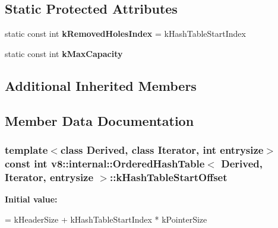 \subsection*{Static Protected Attributes}
\begin{DoxyCompactItemize}
\item 
static const int {\bfseries k\+Removed\+Holes\+Index} = k\+Hash\+Table\+Start\+Index\hypertarget{classv8_1_1internal_1_1_ordered_hash_table_a16c2eaa07a0bb93a9ae8864b899390f9}{}\label{classv8_1_1internal_1_1_ordered_hash_table_a16c2eaa07a0bb93a9ae8864b899390f9}

\item 
static const int {\bfseries k\+Max\+Capacity}
\end{DoxyCompactItemize}
\subsection*{Additional Inherited Members}


\subsection{Member Data Documentation}
\subsubsection[{\texorpdfstring{k\+Hash\+Table\+Start\+Offset}{kHashTableStartOffset}}]{\setlength{\rightskip}{0pt plus 5cm}template$<$class Derived, class Iterator, int entrysize$>$ const int {\bf v8\+::internal\+::\+Ordered\+Hash\+Table}$<$ Derived, Iterator, entrysize $>$\+::k\+Hash\+Table\+Start\+Offset\hspace{0.3cm}{\ttfamily [static]}}\hypertarget{classv8_1_1internal_1_1_ordered_hash_table_a21220af19cfae71073ebf7ce752ed921}{}\label{classv8_1_1internal_1_1_ordered_hash_table_a21220af19cfae71073ebf7ce752ed921}
{\bfseries Initial value\+:}
\begin{DoxyCode}
=
      kHeaderSize + kHashTableStartIndex * kPointerSize
\end{DoxyCode}
